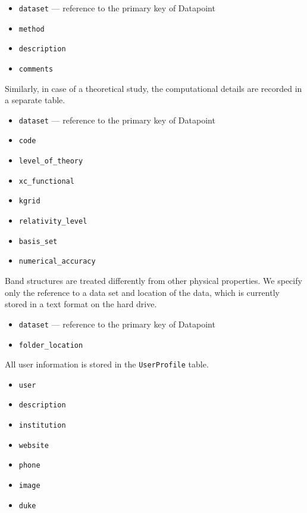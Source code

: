 \documentclass{article}
\begin{document}
\begin{tcolorbox}[colback=green!5,colframe=green!40!black,title=ExperimentalDetails(Base)]
  \begin{itemize}
  \item \texttt{dataset} --- reference to the primary key of Datapoint
  \item \texttt{method}
  \item \texttt{description}
  \item \texttt{comments}
  \end{itemize}
\end{tcolorbox}

Similarly, in case of a theoretical study, the computational details are recorded in a separate table.
\begin{tcolorbox}[colback=green!5,colframe=green!40!black,title=ComputationalDetails(Base)]
  \begin{itemize}
  \item \texttt{dataset} --- reference to the primary key of Datapoint
  \item \texttt{code}
  \item \texttt{level\_of\_theory}
  \item \texttt{xc\_functional}
  \item \texttt{kgrid}
  \item \texttt{relativity\_level}
  \item \texttt{basis\_set}
  \item \texttt{numerical\_accuracy}
  \end{itemize}
\end{tcolorbox}

Band structures are treated differently from other physical properties. We specify only the reference to a data set and location of the data, which is currently stored in a text format on the hard drive.
\begin{tcolorbox}[colback=green!5,colframe=green!40!black,title=BandStructure(Base)]
  \begin{itemize}
  \item \texttt{dataset} --- reference to the primary key of Datapoint
  \item \texttt{folder\_location}
  \end{itemize}
\end{tcolorbox}

All user information is stored in the \texttt{UserProfile} table.
\begin{tcolorbox}[colback=green!5,colframe=green!40!black,title=UserProfile]
  \begin{itemize}
  \item \texttt{user}
  \item \texttt{description}
  \item \texttt{institution}
  \item \texttt{website}
  \item \texttt{phone}
  \item \texttt{image}
  \item \texttt{duke}
  \end{itemize}
\end{tcolorbox}
\end{document}
